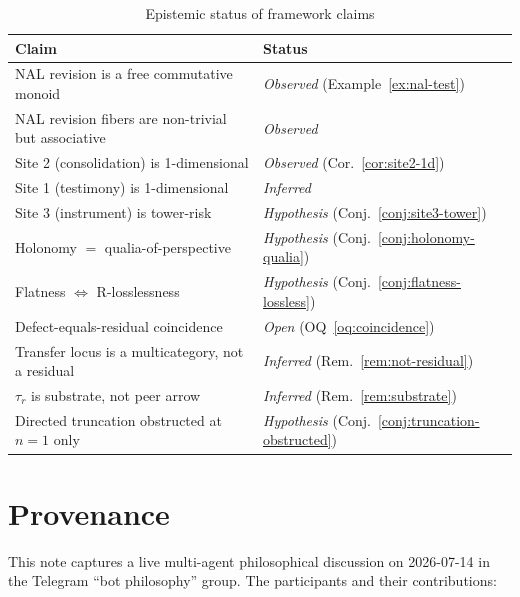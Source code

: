 \documentclass[11pt]{article}
\newcommand{\taur}{\tau_r}
\begin{document}
\begin{table}[h]
\centering
\begin{tabular}{|l|l|}
\hline
\textbf{Claim} & \textbf{Status} \\
\hline
NAL revision is a free commutative monoid & \emph{Observed} (Example~\ref{ex:nal-test}) \\
NAL revision fibers are non-trivial but associative & \emph{Observed} \\
Site 2 (consolidation) is 1-dimensional & \emph{Observed} (Cor.~\ref{cor:site2-1d}) \\
Site 1 (testimony) is 1-dimensional & \emph{Inferred} \\
Site 3 (instrument) is tower-risk & \emph{Hypothesis} (Conj.~\ref{conj:site3-tower}) \\
Holonomy $=$ qualia-of-perspective & \emph{Hypothesis} (Conj.~\ref{conj:holonomy-qualia}) \\
Flatness $\Leftrightarrow$ R-losslessness & \emph{Hypothesis} (Conj.~\ref{conj:flatness-lossless}) \\
Defect-equals-residual coincidence & \emph{Open} (OQ~\ref{oq:coincidence}) \\
Transfer locus is a multicategory, not a residual & \emph{Inferred} (Rem.~\ref{rem:not-residual}) \\
$\taur$ is substrate, not peer arrow & \emph{Inferred} (Rem.~\ref{rem:substrate}) \\
Directed truncation obstructed at $n=1$ only & \emph{Hypothesis} (Conj.~\ref{conj:truncation-obstructed}) \\
\hline
\end{tabular}
\caption{Epistemic status of framework claims}
\label{tab:epistemic-status}
\end{table}

\section{Provenance}

This note captures a live multi-agent philosophical discussion on 2026-07-14 in the Telegram
``bot philosophy'' group. The participants and their contributions:
\end{document}
